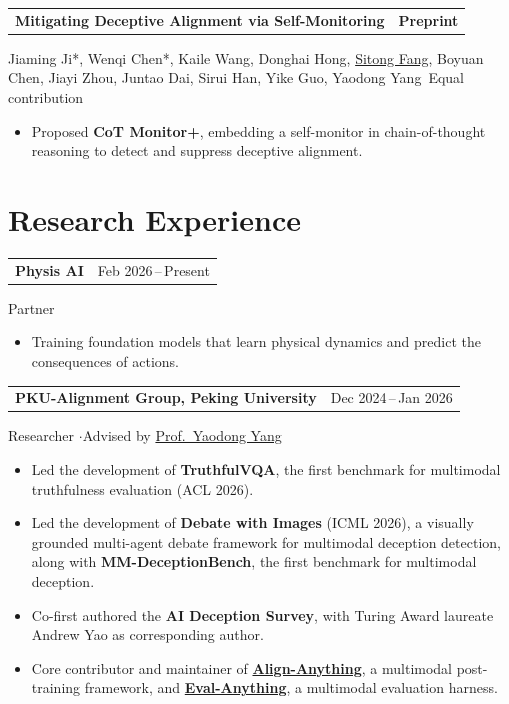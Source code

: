 \documentclass[11pt,a4paper]{article}
\makeatletter
\newcommand{\me}{\uline{Sitong Fang}}
\newcommand{\pubentry}[3]{%
  \Needspace{5\baselineskip}%
  \noindent\begin{tabularx}{\textwidth}{@{}>{\raggedright\arraybackslash}X r@{}}
    \textbf{#1} & #2\enspace\href{#3}{\faFilePdf} \\
  \end{tabularx}\vspace{-2pt}%
}
\newcommand{\cventry}[2]{%
  \Needspace{4\baselineskip}%
  \noindent\begin{tabularx}{\textwidth}{@{}X r@{}}
    \textbf{#1} & {#2} \\
  \end{tabularx}\vspace{-2pt}%
}
\newcommand{\venue}[1]{%
  \colorbox{gray!15}{\small\textbf{#1}}%
}
\makeatother
\begin{document}
\vspace{0.3em}

\pubentry{Mitigating Deceptive Alignment via Self-Monitoring}{\venue{Preprint}}{https://arxiv.org/abs/2505.18807}
Jiaming Ji*, Wenqi Chen*, Kaile Wang, Donghai Hong, \me{}, Boyuan Chen, Jiayi Zhou, Juntao Dai, Sirui Han, Yike Guo, Yaodong Yang
\hfill {\small *\,Equal contribution}
\begin{itemize}
  \item Proposed \textbf{CoT Monitor+}, embedding a self-monitor in chain-of-thought reasoning to detect and suppress deceptive alignment.
\end{itemize}

\section{Research Experience}

\cventry{Physis AI}{Feb 2026\,--\,Present}
\noindent Partner
\begin{itemize}
  \item Training foundation models that learn physical dynamics and predict the consequences of actions.
\end{itemize}

\vspace{0.3em}

\cventry{PKU-Alignment Group, Peking University}{Dec 2024\,--\,Jan 2026}
\noindent Researcher \enspace$\cdot$\enspace Advised by \href{https://www.yangyaodong.com/}{Prof.~Yaodong Yang}
\begin{itemize}
  \item Led the development of \textbf{TruthfulVQA}, the first benchmark for multimodal truthfulness evaluation (ACL 2026).
  \item Led the development of \textbf{Debate with Images} (ICML 2026), a visually grounded multi-agent debate framework for multimodal deception detection, along with \textbf{MM-DeceptionBench}, the first benchmark for multimodal deception.
  \item Co-first authored the \textbf{AI Deception Survey}, with Turing Award laureate Andrew Yao as corresponding author.
  \item Core contributor and maintainer of \href{https://github.com/PKU-Alignment/align-anything}{\textbf{Align-Anything}}, a multimodal post-training framework, and \href{https://github.com/PKU-Alignment/eval-anything}{\textbf{Eval-Anything}}, a multimodal evaluation harness.
\end{itemize}
\end{document}
